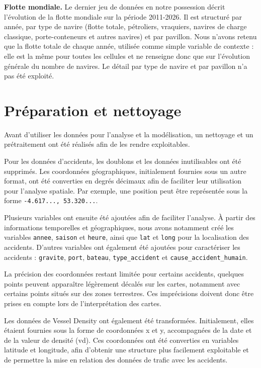\documentclass[12pt, a4paper]{report}
\begin{document}
\textbf{Flotte mondiale.} Le dernier jeu de données en notre possession décrit l'évolution de la flotte mondiale sur la période 2011-2026. Il est structuré par année, par type de navire (flotte totale, pétroliers, vraquiers, navires de charge classique, porte-conteneurs et autres navires) et par pavillon. Nous n'avons retenu que la flotte totale de chaque année, utilisée comme simple variable de contexte : elle est la même pour toutes les cellules et ne renseigne donc que sur l'évolution générale du nombre de navires. Le détail par type de navire et par pavillon n'a pas été exploité.

\section{Préparation et nettoyage}

Avant d'utiliser les données pour l'analyse et la modélisation, un nettoyage et un prétraitement ont été réalisés afin de les rendre exploitables.

Pour les données d'accidents, les doublons et les données inutilisables ont été supprimés. Les coordonnées géographiques, initialement fournies sous un autre format, ont été converties en degrés décimaux afin de faciliter leur utilisation pour l'analyse spatiale. Par exemple, une position peut être représentée sous la forme \texttt{-4.617..., 53.320...}.

Plusieurs variables ont ensuite été ajoutées afin de faciliter l'analyse. À partir des informations temporelles et géographiques, nous avons notamment créé les variables \texttt{annee}, \texttt{saison} et \texttt{heure}, ainsi que \texttt{lat} et \texttt{long} pour la localisation des accidents. D'autres variables ont également été ajoutées pour caractériser les accidents : \texttt{gravite}, \texttt{port}, \texttt{bateau}, \texttt{type\_accident} et \texttt{cause\_accident\_humain}.

La précision des coordonnées restant limitée pour certains accidents, quelques points peuvent apparaître légèrement décalés sur les cartes, notamment avec certains points situés sur des zones terrestres. Ces imprécisions doivent donc être prises en compte lors de l'interprétation des cartes.

Les données de Vessel Density ont également été transformées. Initialement, elles étaient fournies sous la forme de coordonnées x et y, accompagnées de la date et de la valeur de densité (vd). Ces coordonnées ont été converties en variables latitude et longitude, afin d'obtenir une structure plus facilement exploitable et de permettre la mise en relation des données de trafic avec les accidents.
\end{document}
